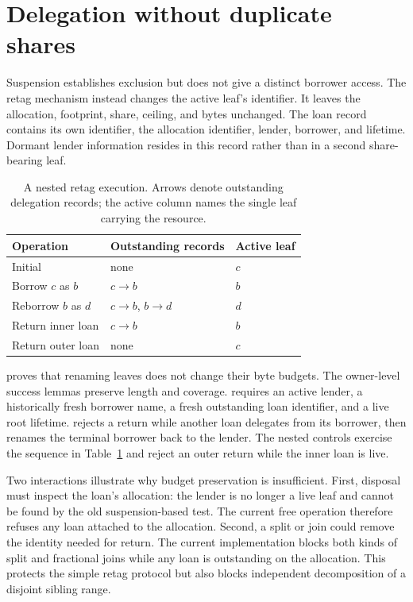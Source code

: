 \documentclass[a4paper,UKenglish,cleveref]{lipics-v2021}
\begin{document}
\section{Delegation without duplicate shares}
\label{sec:delegation}

Suspension establishes exclusion but does not give a distinct borrower access.
The retag mechanism instead changes the active leaf's identifier. It leaves the
allocation, footprint, share, ceiling, and bytes unchanged. The loan record
contains its own identifier, the allocation identifier, lender, borrower, and
lifetime. Dormant lender information resides in this record rather than in a
second share-bearing leaf.

\begin{table}[t]
\centering
\caption{A nested retag execution. Arrows denote outstanding delegation records;
the active column names the single leaf carrying the resource.}
\label{tab:delegation}
\begin{tabular}{lll}
\toprule
Operation & Outstanding records & Active leaf \\
\midrule
Initial & none & $c$ \\
Borrow $c$ as $b$ & $c\to b$ & $b$ \\
Reborrow $b$ as $d$ & $c\to b$, $b\to d$ & $d$ \\
Return inner loan & $c\to b$ & $b$ \\
Return outer loan & none & $c$ \\
\bottomrule
\end{tabular}
\end{table}

 proves that renaming leaves does not change their
byte budgets. The owner-level success lemmas preserve length and coverage.
 requires an active lender, a historically fresh
borrower name, a fresh outstanding loan identifier, and a live root lifetime.
 rejects a return while another loan delegates from its
borrower, then renames the terminal borrower back to the lender. The nested
controls exercise the sequence in Table~\ref{tab:delegation} and reject an
outer return while the inner loan is live.

Two interactions illustrate why budget preservation is insufficient. First,
disposal must inspect the loan's allocation: the lender is no longer a live leaf
and cannot be found by the old suspension-based test. The current free operation
therefore refuses any loan attached to the allocation. Second, a split or join
could remove the identity needed for return. The current implementation blocks
both kinds of split and fractional joins while any loan is outstanding on the
allocation. This protects the simple retag protocol but also blocks independent
decomposition of a disjoint sibling range.
\end{document}
